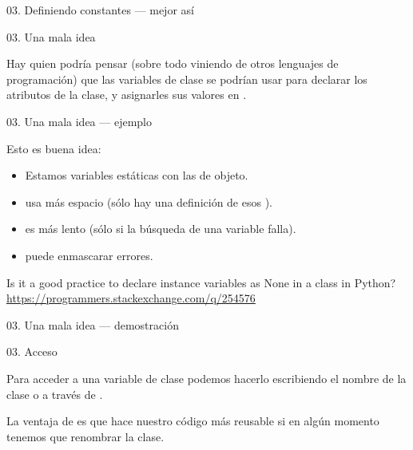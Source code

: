 \begin{frame}{03. Definiendo constantes — mejor así}
  \footnotesize
\end{frame}

\begin{frame}{03. Una mala idea}
  \small
  \begin{justify}
    Hay quien podría pensar (sobre todo viniendo de otros lenguajes de
    programación) que las variables de clase se podrían usar para
    declarar los atributos de la clase, y asignarles sus valores en
    .
  \end{justify}

\end{frame}

\begin{frame}{03. Una mala idea — ejemplo}
  \small
  \begin{alertblock}{}
    \centering
    Esto  es buena idea:
  \end{alertblock}

  \begin{itemize}
    \item Estamos  variables estáticas con las de
      objeto.
    \item {} usa más espacio (sólo hay una definición de
      esos ).
    \item {} es más lento (sólo si la búsqueda de una
      variable falla).
    \item {} puede enmascarar errores.
  \end{itemize}

  \footnotesize
  \begin{block}
    {\centering Is it a good practice to declare instance variables as None in a class in Python?}
    \centering \url{https://programmers.stackexchange.com/q/254576}
  \end{block}
\end{frame}

\begin{frame}{03. Una mala idea — demostración}
  \footnotesize
\end{frame}

\begin{frame}{03. Acceso}
  \begin{block}{}
    \centering
    Para acceder a una variable de clase podemos hacerlo escribiendo
    el nombre de la clase o a través de .
  \end{block}

  \begin{center}
    \small
    \centering
    La ventaja de  es que hace nuestro código más
    reusable si en algún momento tenemos que renombrar la clase.
  \end{center}
\end{frame}

